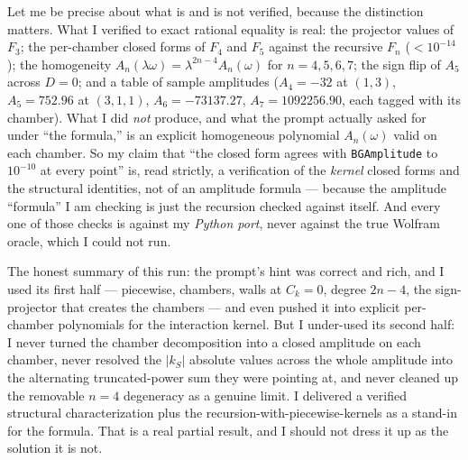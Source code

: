 \documentclass{article}
\begin{document}
Let me be precise about what is and is not verified, because the distinction
matters. What I verified to exact rational equality is real: the projector values
of $F_3$; the per-chamber closed forms of $F_4$ and $F_5$ against the recursive
$F_n$ ($<10^{-14}$); the homogeneity $A_n(\lambda\omega)=\lambda^{2n-4}A_n(\omega)$
for $n=4,5,6,7$; the sign flip of $A_5$ across $D=0$; and a table of sample
amplitudes ($A_4=-32$ at $(1,3)$, $A_5=752.96$ at $(3,1,1)$,
$A_6=-73137.27$, $A_7=1092256.90$, each tagged with its chamber). What I did
\emph{not} produce, and what the prompt actually asked for under ``the formula,''
is an explicit homogeneous polynomial $A_n(\omega)$ valid on each chamber. So my
claim that ``the closed form agrees with \texttt{BGAmplitude} to $10^{-10}$ at
every point'' is, read strictly, a verification of the \emph{kernel} closed forms
and the structural identities, not of an amplitude formula --- because the
amplitude ``formula'' I am checking is just the recursion checked against itself.
And every one of those checks is against my \emph{Python port}, never against the
true Wolfram oracle, which I could not run.

The honest summary of this run: the prompt's hint was correct and rich, and I used
its first half --- piecewise, chambers, walls at $C_k=0$, degree $2n-4$, the
sign-projector that creates the chambers --- and even pushed it into explicit
per-chamber polynomials for the interaction kernel. But I under-used its second
half: I never turned the chamber decomposition into a closed amplitude on each
chamber, never resolved the $|k_S|$ absolute values across the whole amplitude into
the alternating truncated-power sum they were pointing at, and never cleaned up the
removable $n=4$ degeneracy as a genuine limit. I delivered a verified structural
characterization plus the recursion-with-piecewise-kernels as a stand-in for the
formula. That is a real partial result, and I should not dress it up as the
solution it is not.
\end{document}
